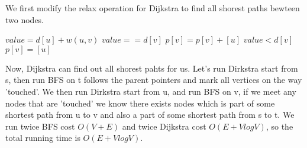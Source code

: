 \documentclass[12pt,twoside]{article}
\begin{document}
We first modify the relax operation for Dijkstra to find all shorest paths bewteen two nodes. 
\begin{codebox}
\li $value=d[u]+w(u,v)$
\li \If $value==d[v]$ \Do
\li $p[v]=p[v]+[u]$ \End
\li \Else \If $value<d[v]$ \Do
\li $p[v]=[u]$ \End
\end{codebox}
Now, Dijkstra can find out all shorest pahts for us. Let's run Dirkstra start from s, then run BFS on t follows the parent pointers and mark all vertices on the way 'touched'. We then run Dirkstra start from u, and run BFS on v, if we meet any nodes that are 'touched' we know there exists nodes  which is part of some shortest path from u to v and also a part of some shortest path from s to t. We run twice BFS cost $O(V+E)$ and twice Dijkstra cost $O(E+VlogV)$, so the total running time is $O(E+VlogV)$.
\end{document}
